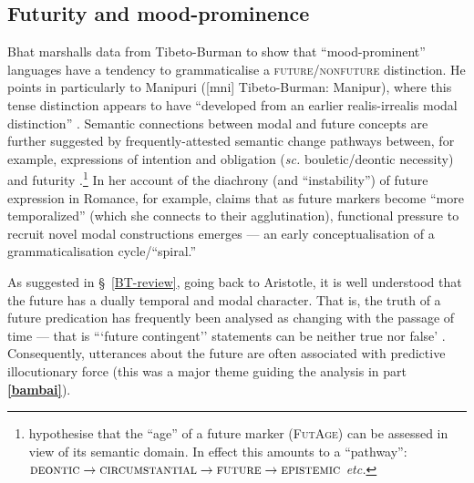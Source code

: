 \subsection{Futurity and mood-prominence}
Bhat marshalls data from Tibeto-Burman to show that ``mood-prominent'' languages have a tendency to grammaticalise a \textsc{future/nonfuture} distinction. He points in particularly to Manipuri ([\gls{mni}] Tibeto-Burman: Manipur), where this tense distinction appears to have ``developed from an earlier realis-irrealis modal distinction'' \citeyearpar[19]{Bhat1999}. Semantic connections between modal and future concepts are further suggested by frequently-attested semantic change pathways between, for example, expressions of intention and obligation (\textit{sc.} bouletic/deontic necessity) and futurity \citep[and then to epistemic modality, \textit{e.g.},][]{Bybee1978,Bybee1991,Bybee1994,Kuteva2019}.\footnote{\citet*{Bybee1991} hypothesise that the ``age'' of a future marker (\textsc{FutAge}) can be assessed in view of its semantic domain. In effect this amounts to a ``pathway'': $\textsc{deontic}\to\textsc{circumstantial}\to\textsc{future}\to\textsc{epistemic}$ \textit{etc.}} In her account of the diachrony (and ``instability'') of future expression in Romance, for example, \citet[31, 75, 106]{Fleischman1982} claims that as future markers become ``more temporalized'' (which she connects to their agglutination), functional pressure to recruit novel modal constructions emerges --- an early conceptualisation of a grammaticalisation cycle/``spiral.''


As suggested in \S~\ref{BT-review}, going back to Aristotle, it is well understood that the future has a dually temporal and modal character. That is, the truth of a future predication has frequently been analysed as changing with the passage of time --- that is ```future contingent'' statements can be neither true nor false' \citep[265]{Thomason1970}. Consequently, utterances about the future are often associated with predictive illocutionary force (this was a major theme guiding the analysis in part \textbf{\ref{bambai}}).

